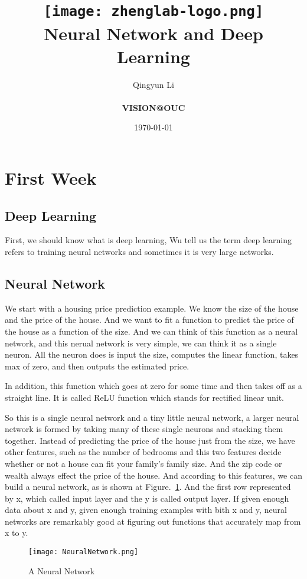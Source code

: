 \documentclass[a4paper]{article}
\title{
    \vspace*{1in}
    \texttt{[image: zhenglab-logo.png]} \\
    \vspace*{1.2in}
    \textbf{\huge Neural Network and Deep Learning}
    \vspace{0.2in}
}
\author{Qingyun Li \\
    \vspace*{0.5in} \\
    \textbf{VISION@OUC} \\
    \vspace*{1in}
}
\date{\today}
\begin{document}
\par
\maketitle
\setcounter{page}{0}
\thispagestyle{empty}
\newpage

\section{First Week}
\subsection{Deep Learning} 
 \par First, we should know what is deep learning, Wu tell us the term deep learning refers to training neural networks and sometimes it is very large networks.
\subsection{Neural Network}
\par We start with a housing price prediction example. We know the size of the house and the price of the house. And we want to fit a function to predict the price of the house as a function of the size. And we can think of this function as a neural network, and this nerual network is very simple, we can think it as a single neuron. All the neuron does is input the size, computes the linear function, takes max of zero, and then outputs the estimated price. 
 \par In addition, this function which goes at zero for some time and then takes off as a straight line. It is called ReLU function which stands for rectified linear unit.
 \par So this is a single neural network and a tiny little neural network, a larger neural network is formed by taking many of these single neurons and stacking them together. Instead of predicting the price of the house just from the size, we have other features, such as the number of bedrooms and this two features decide whether or not a house can fit your family's family size. And the zip code or wealth always effect the price of the house. And according to this features, we can build a neural network, as is shown at Figure.~\ref{network}. And the first row represented by x, which called input layer and the y is called output layer. If given enough data about x and y, given enough training examples with bith x and y, neural networks are remarkably good at figuring out functions that accurately map from x to y.
\begin{figure}[htbp]
 \begin{center}
 \texttt{[image: NeuralNetwork.png]}
  \end{center}
 \caption{A Neural Network}
 \label{network}
\end{figure}
\end{document}
